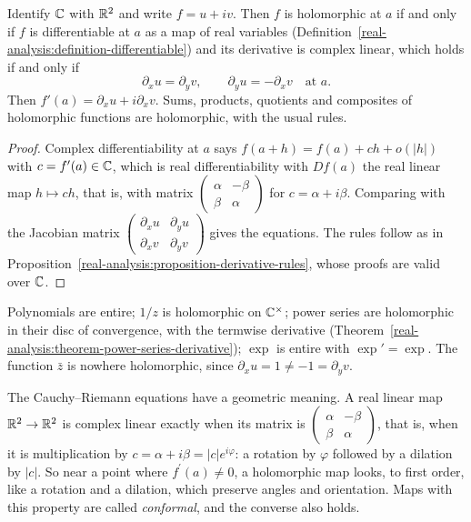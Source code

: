 \begin{proposition}\label{complex-analysis:proposition-cauchy-riemann}
Identify $\mathbb{C}$ with $\mathbb{R}^2$ and write $f = u + iv$. Then $f$ is holomorphic at $a$ if and only if $f$ is differentiable at $a$ as a map of real variables
(Definition~\ref{real-analysis:definition-differentiable}) and its derivative is complex linear, which holds if and only if
\[
\partial_xu = \partial_yv, \qquad \partial_yu = -\partial_xv \quad \text{at } a.
\]
Then $f'(a) = \partial_xu + i\partial_xv$. Sums, products, quotients and composites of holomorphic functions are holomorphic, with the usual rules.
\end{proposition}

\begin{proof}
Complex differentiability at $a$ says $f(a + h) = f(a) + ch + o(|h|)$ with $c = f'(a) \in \mathbb{C}$, which is real differentiability with $Df(a)$ the real linear map $h \mapsto ch$, that is, with matrix
$\left(\begin{smallmatrix} \alpha & -\beta \\ \beta & \alpha \end{smallmatrix}\right)$ for $c = \alpha + i\beta$. Comparing with the Jacobian matrix
$\left(\begin{smallmatrix} \partial_xu & \partial_yu \\ \partial_xv & \partial_yv \end{smallmatrix}\right)$ gives the equations. The rules follow as in
Proposition~\ref{real-analysis:proposition-derivative-rules}, whose proofs are valid over $\mathbb{C}$.
\end{proof}

\begin{example}\label{complex-analysis:example-holomorphic}
Polynomials are entire; $1/z$ is holomorphic on $\mathbb{C}^\times$; power series are holomorphic in their disc of convergence, with the termwise derivative
(Theorem~\ref{real-analysis:theorem-power-series-derivative}); $\exp$ is entire with $\exp' = \exp$. The function $\bar z$ is nowhere holomorphic, since $\partial_xu = 1 \neq -1 = \partial_yv$.
\end{example}

The Cauchy--Riemann equations have a geometric meaning. A real linear map $\mathbb{R}^2 \to \mathbb{R}^2$ is complex linear exactly when its matrix is
$\left(\begin{smallmatrix} \alpha & -\beta \\ \beta & \alpha \end{smallmatrix}\right)$, that is, when it is multiplication by $c = \alpha + i\beta = |c|e^{i\varphi}$: a rotation by $\varphi$ followed by
a dilation by $|c|$. So near a point where $f^{\prime}(a) \neq 0$, a holomorphic map looks, to first order, like a rotation and a dilation, which preserve angles and orientation. Maps with this property are
called \emph{conformal}, and the converse also holds.


